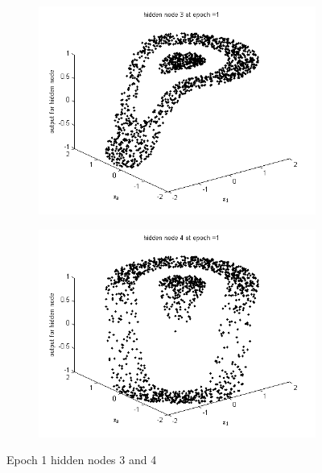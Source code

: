 \documentclass{article}
\begin{document}
\begin{figure}
\begin{subfigure}{.5\textwidth}
  \centering
  \includegraphics[width=.8\linewidth]{Classification/nonlinearlySeparable/h1_3}
 
\end{subfigure}%
\begin{subfigure}{.5\textwidth}
  \centering
  \includegraphics[width=.8\linewidth]{Classification/nonlinearlySeparable/h1_4}
  \end{subfigure}
\caption{Epoch 1 hidden nodes 3 and 4}
\end{figure}
\end{document}

